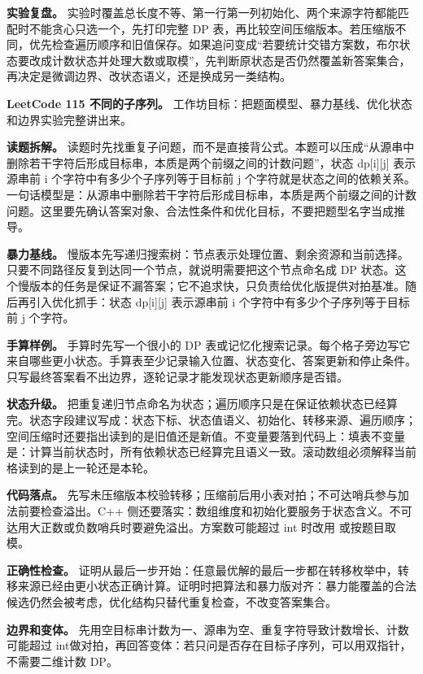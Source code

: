 \textbf{实验复盘。} 实验时覆盖总长度不等、第一行第一列初始化、两个来源字符都能匹配时不能贪心只选一个，先打印完整 DP 表，再比较空间压缩版本。若压缩版不同，优先检查遍历顺序和旧值保存。如果追问变成“若要统计交错方案数，布尔状态要改成计数状态并处理大数或取模”，先判断原状态是否仍然覆盖新答案集合，再决定是微调边界、改状态语义，还是换成另一类结构。

\noindent\textbf{LeetCode 115 不同的子序列。} 工作坊目标：把题面模型、暴力基线、优化状态和边界实验完整讲出来。

\textbf{读题拆解。} 读题时先找重复子问题，而不是直接背公式。本题可以压成“从源串中删除若干字符后形成目标串，本质是两个前缀之间的计数问题”，状态 dp[i][j] 表示源串前 i 个字符中有多少个子序列等于目标前 j 个字符就是状态之间的依赖关系。一句话模型是：从源串中删除若干字符后形成目标串，本质是两个前缀之间的计数问题。这里要先确认答案对象、合法性条件和优化目标，不要把题型名字当成推导。

\textbf{暴力基线。} 慢版本先写递归搜索树：节点表示处理位置、剩余资源和当前选择。只要不同路径反复到达同一个节点，就说明需要把这个节点命名成 DP 状态。这个慢版本的任务是保证不漏答案；它不追求快，只负责给优化版提供对拍基准。随后再引入优化抓手：状态 dp[i][j] 表示源串前 i 个字符中有多少个子序列等于目标前 j 个字符。

\textbf{手算样例。} 手算时先写一个很小的 DP 表或记忆化搜索记录。每个格子旁边写它来自哪些更小状态。手算表至少记录输入位置、状态变化、答案更新和停止条件。只写最终答案看不出边界，逐轮记录才能发现状态更新顺序是否错。

\textbf{状态升级。} 把重复递归节点命名为状态；遍历顺序只是在保证依赖状态已经算完。状态字段建议写成：状态下标、状态值语义、初始化、转移来源、遍历顺序；空间压缩时还要指出读到的是旧值还是新值。不变量要落到代码上：填表不变量是：计算当前状态时，所有依赖状态已经算完且语义一致。滚动数组必须解释当前格读到的是上一轮还是本轮。

\textbf{代码落点。} 先写未压缩版本校验转移；压缩前后用小表对拍；不可达哨兵参与加法前要检查溢出。C++ 侧还要落实：数组维度和初始化要服务于状态含义。不可达用大正数或负数哨兵时要避免溢出。方案数可能超过 int 时改用  或按题目取模。

\textbf{正确性检查。} 证明从最后一步开始：任意最优解的最后一步都在转移枚举中，转移来源已经由更小状态正确计算。证明时把算法和暴力版对齐：暴力能覆盖的合法候选仍然会被考虑，优化结构只替代重复检查，不改变答案集合。

\textbf{边界和变体。} 先用空目标串计数为一、源串为空、重复字符导致计数增长、计数可能超过 int做对拍，再回答变体：若只问是否存在目标子序列，可以用双指针，不需要二维计数 DP。

